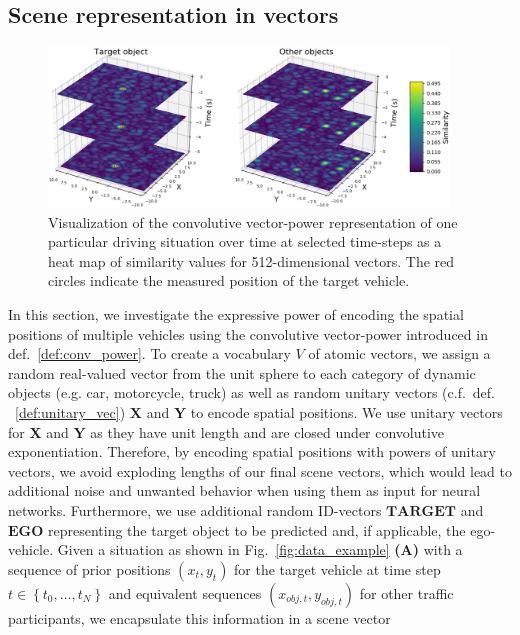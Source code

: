 \subsection{Scene representation in vectors}
\label{subsec:scene_repr}
\begin{figure}[t!]
  \centering
  \includegraphics[width=0.95\textwidth]{imgs/spa_power_representation_in_time_viridis.eps}
  \caption{Visualization of the convolutive vector-power representation of one particular driving situation over time at selected time-steps as a heat map of similarity values for \num{512}-dimensional vectors. The red circles indicate the measured position of the target vehicle.}\label{fig:spa_power}
\end{figure}

In this section, we investigate the expressive power of encoding the spatial positions of multiple vehicles using the convolutive vector-power introduced in def.~\ref{def:conv_power}.
To create a vocabulary $V$ of atomic vectors, we assign a random real-valued vector from the unit sphere to each category of dynamic objects (e.g. car, motorcycle, truck) as well as random unitary vectors (c.f.\ def. ~\ref{def:unitary_vec}) $\mathbf{X}$ and $\mathbf{Y}$ to encode spatial positions.
We use unitary vectors for $\mathbf{X}$ and $\mathbf{Y}$ as they have unit length and are closed under convolutive exponentiation.
Therefore, by encoding spatial positions with powers of unitary vectors, we avoid exploding lengths of our final scene vectors, which would lead to additional noise and unwanted behavior when using them as input for neural networks.
Furthermore, we use additional random ID-vectors $\mathbf{TARGET}$ and $\mathbf{EGO}$ representing the target object to be predicted and, if applicable, the ego-vehicle.
Given a situation as shown in Fig.~\ref{fig:data_example} \textbf{(A)} with a sequence of prior positions $(x_{t}, y_{t})$ for the target vehicle at time step $t \in \left\{t_{0}, \ldots, t_{N} \right\}$ and equivalent sequences $(x_{obj,t}, y_{obj,t})$ for other traffic participants, we encapsulate this information in a scene vector

